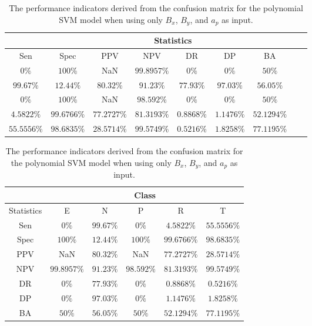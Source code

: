 \begin{table}[!ht]
	\centering
	\begin{tabular}{|c|c|c|c|c|c|c|c|c|}
		\hline
		 & \multicolumn{7}{c|}{Statistics} \\ \hline
		Sen & Spec & PPV & NPV & DR & DP & BA \\ \hline
		$0\%$ & $100\%$ & NaN & $99.8957\%$ & $0\%$ & $0\%$ & $50\%$ \\ \hline
		$99.67\%$ & $12.44\%$ & $80.32\%$ & $91.23\%$ & $77.93\%$ & $97.03\%$ & $56.05\%$ \\ \hline
		$0\%$ & $100\%$ & NaN & $98.592\%$ & $0\%$ & $0\%$ & $50\%$ \\ \hline
		$4.5822\%$ & $99.6766\%$ & $77.2727\%$ & $81.3193\%$ & $0.8868\%$ & $1.1476\%$ & $52.1294\%$ \\ \hline
		$55.5556\%$ & $98.6835\%$ & $28.5714\%$ & $99.5749\%$ & $0.5216\%$ & $1.8258\%$ & $77.1195\%$ \\ \hline
	\end{tabular}
	\caption{The performance indicators derived from the confusion matrix for the polynomial SVM model when using only $B_{x}$, $B_{y}$, and $a_{p}$ as input.}
	\label{tab:cs:xyap:svmPoly}
\end{table}

\begin{table}[!ht]
	\centering
	\begin{tabular}{|c|c|c|c|c|c|}
		\hline
		 & \multicolumn{5}{c|}{Class} \\ \hline
		Statistics & E & N & P & R & T \\ \hline
		Sen & $0\%$ & $99.67\%$ & $0\%$ & $4.5822\%$ & $55.5556\%$ \\ \hline
		Spec & $100\%$ & $12.44\%$ & $100\%$ & $99.6766\%$ & $98.6835\%$ \\ \hline
		PPV & NaN & $80.32\%$ & NaN & $77.2727\%$ & $28.5714\%$ \\ \hline
		NPV & $99.8957\%$ & $91.23\%$ & $98.592\%$ & $81.3193\%$ & $99.5749\%$ \\ \hline
		DR & $0\%$ & $77.93\%$ & $0\%$ & $0.8868\%$ & $0.5216\%$ \\ \hline
		DP & $0\%$ & $97.03\%$ & $0\%$ & $1.1476\%$ & $1.8258\%$ \\ \hline
		BA & $50\%$ & $56.05\%$ & $50\%$ & $52.1294\%$ & $77.1195\%$ \\ \hline
	\end{tabular}
	\caption{The performance indicators derived from the confusion matrix for the polynomial SVM model when using only $B_{x}$, $B_{y}$, and $a_{p}$ as input.}
	\label{tab:cs:reverse:xyap:svmPoly}
\end{table}

